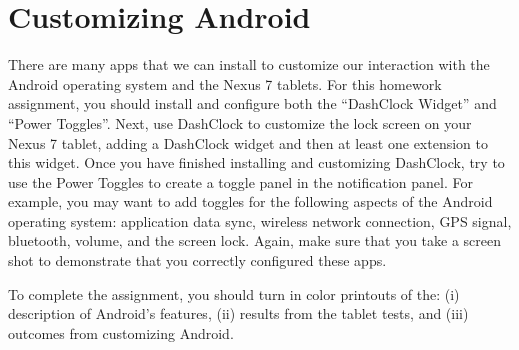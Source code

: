 \section*{Customizing Android}

There are many apps that we can install to customize our interaction with the Android operating system and the Nexus 7
tablets.  For this homework assignment, you should install and configure both the ``DashClock Widget'' and ``Power Toggles''.
Next, use DashClock to customize the lock screen on your Nexus 7 tablet, adding a DashClock widget and then at least one extension
to this widget.  Once you have finished installing and customizing DashClock, try to use the Power Toggles to create a
toggle panel in the notification panel.  For example, you may want to add toggles for the following aspects of the
Android operating system: application data sync, wireless network connection, GPS signal, bluetooth, volume, and the
screen lock.  Again, make sure that you take a screen shot to demonstrate that you correctly configured these apps.

To complete the assignment, you should turn in color printouts of the: (i) description of Android's features, (ii)
results from the tablet tests, and (iii) outcomes from customizing Android.


